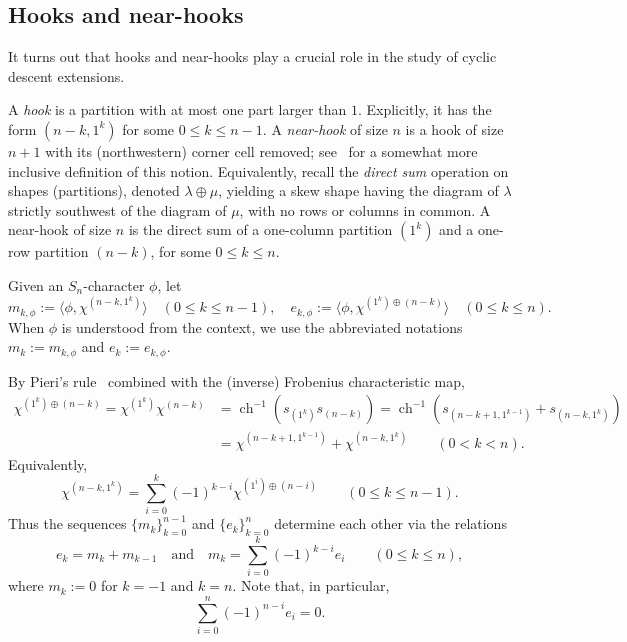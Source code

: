 \documentclass[10pt]{article}
\theoremstyle{definition}
\newcommand{\ch}{{\operatorname{ch}}}
\begin{document}
\subsection{Hooks and near-hooks}\label{sec:near_hooks}

It turns out that hooks and near-hooks play a crucial role in the study of cyclic descent extensions.

A {\em hook} is a partition with at most one part larger than $1$. Explicitly, it has the form $(n-k,1^k)$ for some $0 \le k \le n-1$. 
A {\em near-hook} of size $n$ is a hook of size $n+1$ with its (northwestern) corner cell removed; see~\cite{AER} for a somewhat more inclusive definition of this notion. 
Equivalently, recall the {\em direct sum} operation on shapes (partitions), denoted $\lambda \oplus \mu$, 
yielding a skew shape having the diagram of $\lambda$ strictly southwest of the diagram of $\mu$, with no rows or columns in common.  
A near-hook of size $n$ is the direct sum of a one-column partition $(1^k)$ and a one-row partition $(n-k)$, for some $0 \le k \le n$. 

Given an $S_n$-character $\phi$, let  
\begin{equation}\label{e_k_interpretation1}
    m_{k,\phi}
    := \langle \phi,\chi^{(n-k,1^k)} \rangle 
    \quad (0 \le k \le n-1)
    , \quad
    e_{k,\phi} 
    :=\langle \phi,\chi^{(1^k)\oplus(n-k)} \rangle
    \quad (0 \le k \le n).
\end{equation}
When $\phi$ is understood from the context, we use the abbreviated notations $m_k:=m_{k,\phi}$ and $e_k:=e_{k,\phi}$.

By Pieri's rule~\cite[Theorem 7.5.17]{EC2} 
combined with the (inverse) Frobenius characteristic map,
\begin{align*}
    \chi^{(1^k)\oplus (n-k)} 
    = \chi^{(1^k)} \chi^{(n-k)}
    &= \ch^{-1}(s_{(1^k)}s_{(n-k)})
    = \ch^{-1}(s_{(n-k+1,1^{k-1})} + s_{(n-k,1^k)})\\
    &= \chi^{(n-k+1,1^{k-1})} + \chi^{(n-k,1^k)} 
    \qquad (0<k<n).
\end{align*}
Equivalently,
\[
    \chi^{(n-k,1^k)}=
    \sum_{i=0}^{k} (-1)^{k-i}\chi^{(1^i)\oplus (n-i)} \qquad (0\le k \le n-1).
\]
Thus the sequences $\{m_k\}_{k=0}^{n-1}$ and $\{e_k\}_{k=0}^{n}$ 
determine each other via the relations
\begin{equation}\label{eq:alternating}
    e_k = m_k + m_{k-1}
    \quad \text{and} \quad
    m_k = \sum_{i=0}^k (-1)^{k-i} e_i
    \qquad (0 \le k \le n),
\end{equation}
where $m_k := 0$ for $k = -1$ and $k = n$.
Note that, in particular,
\[
    \sum_{i=0}^{n} (-1)^{n-i} e_i = 0.
\]
\end{document}
